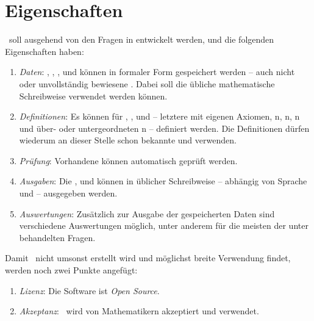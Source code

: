 \section{Eigenschaften}%
\label{sec:Eigenschaften}

\ASBA\ soll ausgehend von den Fragen in  entwickelt werden, und die folgenden Eigenschaften haben:
\begin{enumerate}
	\item \label{Eigenschaft:Daten} \emph{Daten}:
	, , ,  und  können in formaler Form gespeichert werden -- auch nicht oder unvollständig bewiesene .
	Dabei soll die übliche mathematische Schreibweise verwendet werden können.
	\item \label{Eigenschaft:Definitionen} \emph{Definitionen}:
	Es können  für , ,  und  -- letztere mit eigenen Axiomen, n, n, n und über- oder untergeordneten n -- definiert werden.
	Die Definitionen dürfen wiederum an dieser Stelle schon bekannte  und  verwenden.
	\item \label{Eigenschaft:Prüfung} \emph{Prüfung}:
	Vorhandene  können automatisch geprüft werden.
	\item \label{Eigenschaft:Ausgaben} \emph{Ausgaben}:
	Die ,  und  können in üblicher Schreibweise -- abhängig von Sprache und  -- ausgegeben werden.
	\item \label{Eigenschaft:Auswertungen} \emph{Auswertungen}:
	Zusätzlich zur Ausgabe der gespeicherten Daten sind verschiedene Auswertungen möglich, unter anderem für die meisten der unter  behandelten Fragen.
	\setcounter{Enumi}{\value{enumi}}%
\end{enumerate}
%
Damit \ASBA\ nicht umsonst erstellt wird und möglichst breite Verwendung findet, werden noch zwei Punkte angefügt:
\begin{enumerate}
	\setcounter{enumi}{\value{Enumi}}%
	\item \label{Eigenschaft:Lizenz} \emph{Lizenz}:
	Die Software ist \emph{Open Source}.
	\item \label{Eigenschaft:Akzeptanz} \emph{Akzeptanz}:
	\ASBA\ wird von Mathematikern akzeptiert und verwendet.
\end{enumerate}
